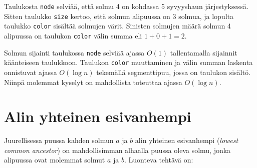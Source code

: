 \begin{center}
\end{center}

Taulukosta \texttt{node} selviää,
että solmu 4 on kohdassa 5 syvyyshaun
järjestyksessä.
Sitten taulukko \texttt{size} kertoo,
että solmun alipuussa on 3 solmua,
ja lopulta taulukko \texttt{color}
sisältää solmujen värit.
Sinisten solmujen määrä solmun 4
alipuussa on taulukon \texttt{color}
välin summa eli $1+0+1=2$.

Solmun sijainti taulukossa \texttt{node}
selviää ajassa $O(1)$ tallentamalla
sijainnit käänteiseen taulukkoon.
Taulukon \texttt{color} muuttaminen ja
välin summan laskenta onnistuvat ajassa $O(\log n)$
tekemällä segmenttipuu, jossa on taulukon sisältö.
Niinpä molemmat kyselyt on mahdollista toteuttaa
ajassa $O(\log n)$.

\section{Alin yhteinen esivanhempi}

Juurellisessa puussa kahden solmun $a$ ja $b$
alin yhteinen esivanhempi (\textit{lowest common ancestor})
on mahdollisimman alhaalla puussa oleva solmu,
jonka alipuussa ovat molemmat solmut $a$ ja $b$.
Luonteva tehtävä on:

